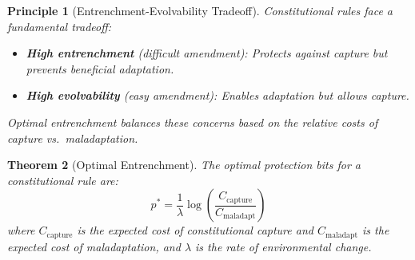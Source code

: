 \documentclass[12pt]{article}
\newtheorem{theorem}{Theorem}[section]
\newtheorem{principle}[theorem]{Principle}
\begin{document}
\begin{principle}[Entrenchment-Evolvability Tradeoff]
Constitutional rules face a fundamental tradeoff:
\begin{itemize}
    \item \textbf{High entrenchment} (difficult amendment): Protects against capture but prevents beneficial adaptation.
    \item \textbf{High evolvability} (easy amendment): Enables adaptation but allows capture.
\end{itemize}
Optimal entrenchment balances these concerns based on the relative costs of capture vs.\ maladaptation.
\end{principle}

\begin{theorem}[Optimal Entrenchment]
\label{thm:optimal-entrenchment}
The optimal protection bits for a constitutional rule are:
\[
p^* = \frac{1}{\lambda} \log \left( \frac{C_{\text{capture}}}{C_{\text{maladapt}}} \right)
\]
where $C_{\text{capture}}$ is the expected cost of constitutional capture and $C_{\text{maladapt}}$ is the expected cost of maladaptation, and $\lambda$ is the rate of environmental change.
\end{theorem}
\end{document}
